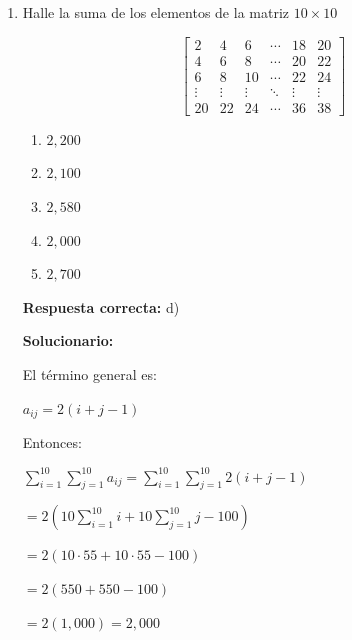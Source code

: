 \begin{enumerate}[resume]
	Las diferencias son:
	
	$8,\ 14,\ 20,\dots$
	
	La segunda diferencia es constante, entonces:
	
	$a_n=3n^2-n+2$
	
	Luego:
	
	$S_{10}=\sum_{n=1}^{10}(3n^2-n+2)$
	
	$=3\sum_{n=1}^{10}n^2-\sum_{n=1}^{10}n+2\sum_{n=1}^{10}1$
	
	$=3(385)-55+20$
	
	$=1,155-55+20$
	
	
	\vspace{6mm}
	
	\item Halle la suma de los elementos de la matriz $10\times10$
	
	\[
	\begin{bmatrix}
		2 & 4 & 6 & \cdots & 18 & 20\\
		4 & 6 & 8 & \cdots & 20 & 22\\
		6 & 8 & 10 & \cdots & 22 & 24\\
		\vdots & \vdots & \vdots & \ddots & \vdots & \vdots\\
		20 & 22 & 24 & \cdots & 36 & 38
	\end{bmatrix}
	\]
	
	\begin{enumerate}[label=\alph*)]
		\item $2,200$
		\item $2,100$
		\item $2,580$
		\item $2,000$
		\item $2,700$
	\end{enumerate}
	\textbf{Respuesta correcta:} d)
	
	\vspace{2mm}
	\textbf{Solucionario:}
	
	El término general es:
	
	$a_{ij}=2(i+j-1)$
	
	Entonces:
	
	$\displaystyle \sum_{i=1}^{10}\sum_{j=1}^{10} a_{ij}
	=\sum_{i=1}^{10}\sum_{j=1}^{10}2(i+j-1)$
	
	$=2\left(10\sum_{i=1}^{10}i+10\sum_{j=1}^{10}j-100\right)$
	
	$=2(10\cdot55+10\cdot55-100)$
	
	$=2(550+550-100)$
	
	$=2(1,000)=2,000$
	
	
	\vspace{6mm}
	
\end{enumerate}

